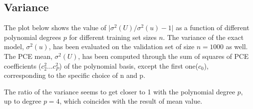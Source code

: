 \documentclass[a4paper,12pt]{article} %
\begin{document}
\subsection{Variance}
The plot below shows the value of $\vert\sigma^2(U)/\sigma^2(u) -1\vert$ as a function of different polynomial degrees $p$ for different training set sizes $n$. The variance of the exact model, $\sigma^2(u)$, has been evaluated on the validation set of size $n=1000$ as well. The PCE mean, $\sigma^2(U)$, has been computed through the sum of squares of PCE coefficients ($c_2^2$...$c_P^2$) of the polynomial basis, except the first one($c_0$), corresponding to the specific choice of n and p.
\begin{figure}[H]
\centering
{}
\end{figure}
The ratio of the variance seems to get closer to 1 with the polynomial degree $p$, up to degree $p=4$, which coincides with the result of mean value.
\end{document}
